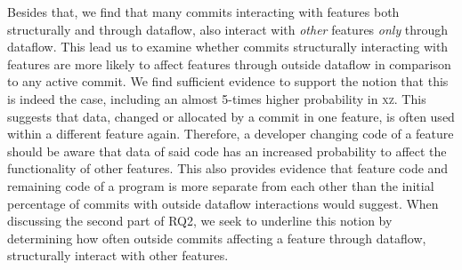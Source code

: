 Besides that, we find that many commits interacting with features both structurally and through dataflow, also interact with \emph{other} features \emph{only} through dataflow.
This lead us to examine whether commits structurally interacting with features are more likely to affect features through outside dataflow in comparison to any active commit.
We find sufficient evidence to support the notion that this is indeed the case, including an almost 5-times higher probability in \textsc{xz}.
This suggests that data, changed or allocated by a commit in one feature, is often used within a different feature again.
Therefore, a developer changing code of a feature should be aware that data of said code has an increased probability to affect the functionality of other features.
This also provides evidence that feature code and remaining code of a program is more separate from each other than the initial percentage of commits with outside dataflow interactions would suggest.
When discussing the second part of RQ2, we seek to underline this notion by determining how often outside commits affecting a feature through dataflow, structurally interact with other features.

